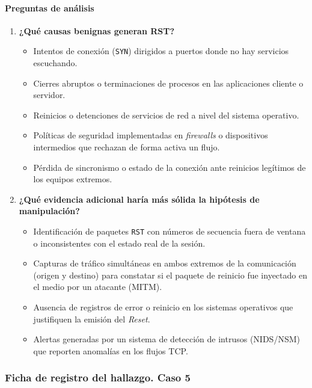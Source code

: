 \paragraph{Preguntas de análisis}
\begin{enumerate}
    \item \textbf{¿Qué causas benignas generan RST?}
    \begin{itemize}
        \item Intentos de conexión (\texttt{SYN}) dirigidos a puertos donde no hay servicios escuchando.
        \item Cierres abruptos o terminaciones de procesos en las aplicaciones cliente o servidor.
        \item Reinicios o detenciones de servicios de red a nivel del sistema operativo.
        \item Políticas de seguridad implementadas en \textit{firewalls} o dispositivos intermedios que rechazan de forma activa un flujo.
        \item Pérdida de sincronismo o estado de la conexión ante reinicios legítimos de los equipos extremos.
    \end{itemize}
    
    \item \textbf{¿Qué evidencia adicional haría más sólida la hipótesis de manipulación?}
    \begin{itemize}
        \item Identificación de paquetes \texttt{RST} con números de secuencia fuera de ventana o inconsistentes con el estado real de la sesión.
        \item Capturas de tráfico simultáneas en ambos extremos de la comunicación (origen y destino) para constatar si el paquete de reinicio fue inyectado en el medio por un atacante (MITM).
        \item Ausencia de registros de error o reinicio en los sistemas operativos que justifiquen la emisión del \textit{Reset}.
        \item Alertas generadas por un sistema de detección de intrusos (NIDS/NSM) que reporten anomalías en los flujos TCP.
    \end{itemize}
\end{enumerate}

\subsubsection{Ficha de registro del hallazgo. Caso 5}

